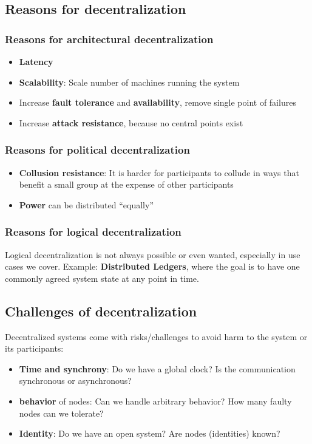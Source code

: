 \documentclass[12pt,A4]{extarticle}
\begin{document}
\subsection{Reasons for decentralization}
\subsubsection{Reasons for architectural decentralization}
\begin{itemize}
  \item{\textbf{Latency}}
  \item{\textbf{Scalability}: Scale number of machines running the system}
  \item{Increase \textbf{fault tolerance} and \textbf{availability}, remove single point of failures}
  \item{Increase \textbf{attack resistance}, because no central points exist}
\end{itemize}

\subsubsection{Reasons for political decentralization}
\begin{itemize}
  \item{\textbf{Collusion resistance}: It is harder for participants to collude in ways that benefit a small group at the expense of other participants}
  \item{\textbf{Power} can be distributed ``equally''}
\end{itemize}

\subsubsection{Reasons for logical decentralization}
Logical decentralization is not always possible or even wanted, especially in use cases we cover. Example: \textbf{Distributed Ledgers}, where the goal is to have one commonly agreed system state at any point in time.

\subsection{Challenges of decentralization}
Decentralized systems come with risks/challenges to avoid harm to the system or its participants:
\begin{itemize}
  \item{\textbf{Time and synchrony}: Do we have a global clock? Is the communication synchronous or asynchronous?}
  \item{\textbf{behavior} of nodes: Can we handle arbitrary behavior? How many faulty nodes can we tolerate?}
  \item{\textbf{Identity}: Do we have an open system? Are nodes (identities) known?}
\end{itemize}
\end{document}
